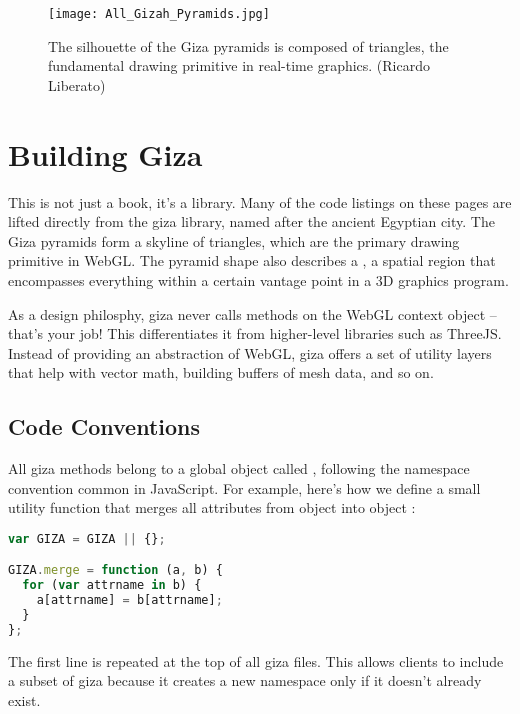 
\begin{figure}[htb]\centering
  \texttt{[image: All\_Gizah\_Pyramids.jpg]}
  \caption{The silhouette of the Giza pyramids is composed of triangles, the fundamental drawing primitive in real-time graphics. (Ricardo Liberato)}
  \label{fig:Giza}
\end{figure}

\section{Building Giza}

This is not just a book, it's a library.  Many of the code listings on these pages are lifted directly from the giza library, named after the ancient Egyptian city.  The Giza pyramids form a skyline of triangles, which are the primary drawing primitive in WebGL.  The pyramid shape also describes a , a spatial region that encompasses everything within a certain vantage point in a 3D graphics program.

As a design philosphy, giza never calls methods on the WebGL context object -- that's your job!  This differentiates it from higher-level libraries such as ThreeJS.  Instead of providing an abstraction of WebGL, giza offers a set of utility layers that help with vector math, building buffers of mesh data, and so on.

\subsection{Code Conventions}

All giza methods belong to a global object called , following the namespace convention common in JavaScript.  For example, here's how we define a small utility function that merges all attributes from object  into object :

\begin{lstlisting}[language=JavaScript]
var GIZA = GIZA || {};

GIZA.merge = function (a, b) {
  for (var attrname in b) {
    a[attrname] = b[attrname];
  }
};
\end{lstlisting}

The first line is repeated at the top of all giza files.  This allows clients to include a subset of giza because it creates a new  namespace only if it doesn't already exist.

